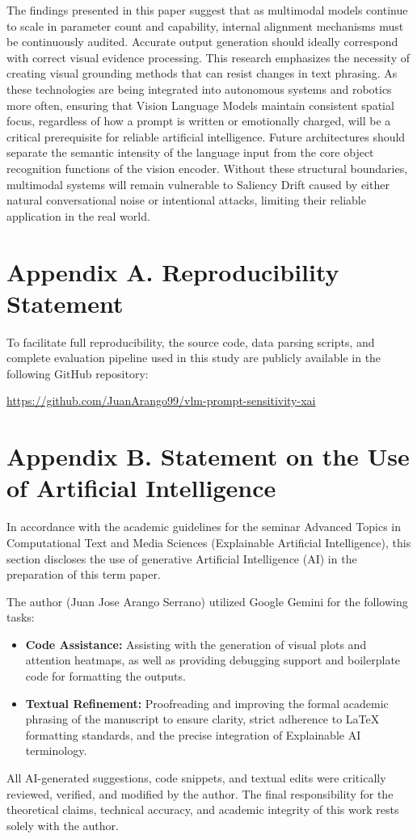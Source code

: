 \documentclass[11pt, letterpaper]{article}
\begin{document}
The findings presented in this paper suggest that as multimodal models continue to scale in parameter count and capability, internal alignment mechanisms must be continuously audited. Accurate output generation should ideally correspond with correct visual evidence processing. This research emphasizes the necessity of creating visual grounding methods that can resist changes in text phrasing. As these technologies are being integrated into autonomous systems and robotics more often, ensuring that Vision Language Models maintain consistent spatial focus, regardless of how a prompt is written or emotionally charged, will be a critical prerequisite for reliable artificial intelligence. Future architectures should separate the semantic intensity of the language input from the core object recognition functions of the vision encoder. Without these structural boundaries, multimodal systems will remain vulnerable to Saliency Drift caused by either natural conversational noise or intentional attacks, limiting their reliable application in the real world.

\newpage
\nocite{*}
  

\newpage
\appendix
\section*{Appendix A. Reproducibility Statement}
To facilitate full reproducibility, the source code, data parsing scripts, and complete evaluation pipeline used in this study are publicly available in the following GitHub repository:
\begin{center}
\url{https://github.com/JuanArango99/vlm-prompt-sensitivity-xai}
\end{center}

\section*{Appendix B. Statement on the Use of Artificial Intelligence}
In accordance with the academic guidelines for the seminar Advanced Topics in Computational Text and Media Sciences (Explainable Artificial Intelligence), this section discloses the use of generative Artificial Intelligence (AI) in the preparation of this term paper.

The author (Juan Jose Arango Serrano) utilized Google Gemini for the following tasks:
\begin{itemize}
    \item \textbf{Code Assistance:} Assisting with the generation of visual plots and attention heatmaps, as well as providing debugging support and boilerplate code for formatting the outputs.
    \item \textbf{Textual Refinement:} Proofreading and improving the formal academic phrasing of the manuscript to ensure clarity, strict adherence to LaTeX formatting standards, and the precise integration of Explainable AI terminology.
\end{itemize}

All AI-generated suggestions, code snippets, and textual edits were critically reviewed, verified, and modified by the author. The final responsibility for the theoretical claims, technical accuracy, and academic integrity of this work rests solely with the author.
\end{document}
